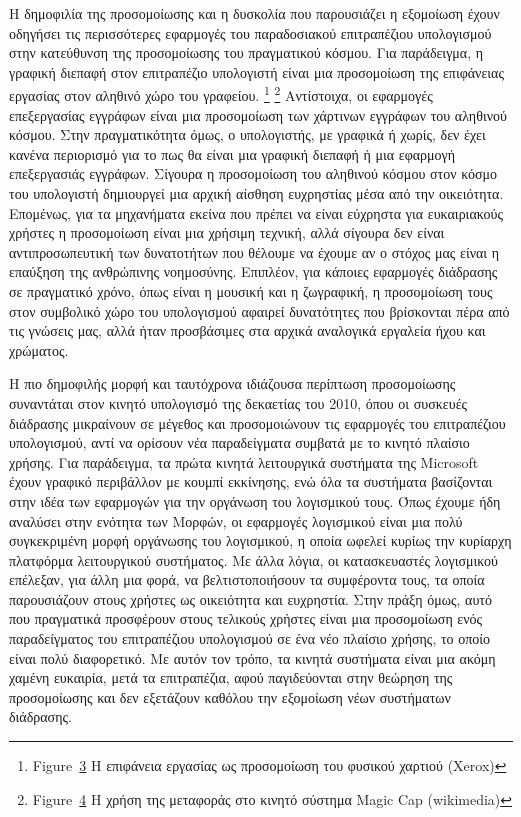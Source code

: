 \documentclass[
]{article}
\begin{document}
Η δημοφιλία της προσομοίωσης και η δυσκολία που παρουσιάζει η εξομοίωση
έχουν οδηγήσει τις περισσότερες εφαρμογές του παραδοσιακού επιτραπέζιου
υπολογισμού στην κατεύθυνση της προσομοίωσης του πραγματικού κόσμου. Για
παράδειγμα, η γραφική διεπαφή στον επιτραπέζιο υπολογιστή είναι μια
προσομοίωση της επιφάνειας εργασίας στον αληθινό χώρο του γραφείου.
\footnote{Figure~\protect\hyperlink{fig:paper-simulation}{3} Η επιφάνεια
  εργασίας ως προσομοίωση του φυσικού χαρτιού (Xerox)} \footnote{Figure~\protect\hyperlink{fig:magic-cap}{4}
  Η χρήση της μεταφοράς στο κινητό σύστημα Magic Cap (wikimedia)}
Αντίστοιχα, οι εφαρμογές επεξεργασίας εγγράφων είναι μια προσομοίωση των
χάρτινων εγγράφων του αληθινού κόσμου. Στην πραγματικότητα όμως, ο
υπολογιστής, με γραφικά ή χωρίς, δεν έχει κανένα περιορισμό για το πως
θα είναι μια γραφική διεπαφή ή μια εφαρμογή επεξεργασιάς εγγράφων.
Σίγουρα η προσομοίωση του αληθινού κόσμου στον κόσμο του υπολογιστή
δημιουργεί μια αρχική αίσθηση ευχρηστίας μέσα από την οικειότητα.
Επομένως, για τα μηχανήματα εκείνα που πρέπει να είναι εύχρηστα για
ευκαιριακούς χρήστες η προσομοίωση είναι μια χρήσιμη τεχνική, αλλά
σίγουρα δεν είναι αντιπροσωπευτική των δυνατοτήτων που θέλουμε να έχουμε
αν ο στόχος μας είναι η επαύξηση της ανθρώπινης νοημοσύνης. Επιπλέον,
για κάποιες εφαρμογές διάδρασης σε πραγματικό χρόνο, όπως είναι η
μουσική και η ζωγραφική, η προσομοίωση τους στον συμβολικό χώρο του
υπολογισμού αφαιρεί δυνατότητες που βρίσκονται πέρα από τις γνώσεις μας,
αλλά ήταν προσβάσιμες στα αρχικά αναλογικά εργαλεία ήχου και χρώματος.

Η πιο δημοφιλής μορφή και ταυτόχρονα ιδιάζουσα περίπτωση προσομοίωσης
συναντάται στον κινητό υπολογισμό της δεκαετίας του 2010, όπου οι
συσκευές διάδρασης μικραίνουν σε μέγεθος και προσομοιώνουν τις εφαρμογές
του επιτραπέζιου υπολογισμού, αντί να ορίσουν νέα παραδείγματα συμβατά
με το κινητό πλαίσιο χρήσης. Για παράδειγμα, τα πρώτα κινητά λειτουργικά
συστήματα της Microsoft έχουν γραφικό περιβάλλον με κουμπί εκκίνησης,
ενώ όλα τα συστήματα βασίζονται στην ιδέα των εφαρμογών για την οργάνωση
του λογισμικού τους. Όπως έχουμε ήδη αναλύσει στην ενότητα των Μορφών,
οι εφαρμογές λογισμικού είναι μια πολύ συγκεκριμένη μορφή οργάνωσης του
λογισμικού, η οποία ωφελεί κυρίως την κυρίαρχη πλατφόρμα λειτουργικού
συστήματος. Με άλλα λόγια, οι κατασκευαστές λογισμικού επέλεξαν, για
άλλη μια φορά, να βελτιστοποιήσουν τα συμφέροντα τους, τα οποία
παρουσιάζουν στους χρήστες ως οικειότητα και ευχρηστία. Στην πράξη όμως,
αυτό που πραγματικά προσφέρουν στους τελικούς χρήστες είναι μια
προσομοίωση ενός παραδείγματος του επιτραπέζιου υπολογισμού σε ένα νέο
πλαίσιο χρήσης, το οποίο είναι πολύ διαφορετικό. Με αυτόν τον τρόπο, τα
κινητά συστήματα είναι μια ακόμη χαμένη ευκαιρία, μετά τα επιτραπέζια,
αφού παγιδεύονται στην θεώρηση της προσομοίωσης και δεν εξετάζουν
καθόλου την εξομοίωση νέων συστήματων διάδρασης.
\end{document}
